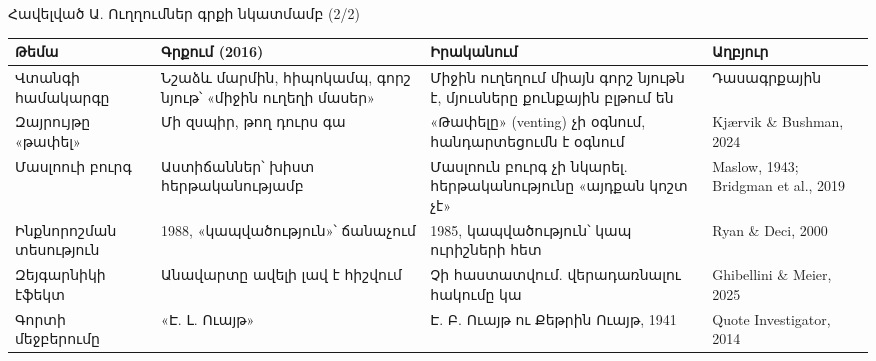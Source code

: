 \begin{frame}{Հավելված Ա. Ուղղումներ գրքի նկատմամբ (2/2)}
  \scriptsize
  \setlength{\tabcolsep}{4pt}
  \renewcommand{\arraystretch}{1.15}
  \begin{tabular}{@{}L{2.4cm}L{3.4cm}L{4.5cm}L{3.2cm}@{}}
    \toprule
    \textbf{Թեմա} & \textbf{Գրքում (2016)} & \textbf{Իրականում} & \textbf{Աղբյուր}\\
    \midrule
    Վտանգի համակարգը & Նշաձև մարմին, հիպոկամպ, գորշ նյութ՝ «միջին ուղեղի մասեր» & Միջին ուղեղում միայն գորշ նյութն է, մյուսները քունքային բլթում են & Դասագրքային\\
    Զայրույթը «թափել» & Մի զսպիր, թող դուրս գա & «Թափելը» (venting) չի օգնում, հանդարտեցումն է օգնում & Kjærvik \& Bushman, 2024\\
    Մասլոուի բուրգ & Աստիճաններ՝ խիստ հերթականությամբ & Մասլոուն բուրգ չի նկարել. հերթականությունը «այդքան կոշտ չէ» & Maslow, 1943; Bridgman et al., 2019\\
    Ինքնորոշման տեսություն & 1988, «կապվածություն»՝ ճանաչում & 1985, կապվածություն՝ կապ ուրիշների հետ & Ryan \& Deci, 2000\\
    Զեյգարնիկի էֆեկտ & Անավարտը ավելի լավ է հիշվում & Չի հաստատվում. վերադառնալու հակումը կա & Ghibellini \& Meier, 2025\\
    Գորտի մեջբերումը & «Է. Լ. Ուայթ» & Է. Բ. Ուայթ ու Քեթրին Ուայթ, 1941 & Quote Investigator, 2014\\
    \bottomrule
  \end{tabular}
\end{frame}


